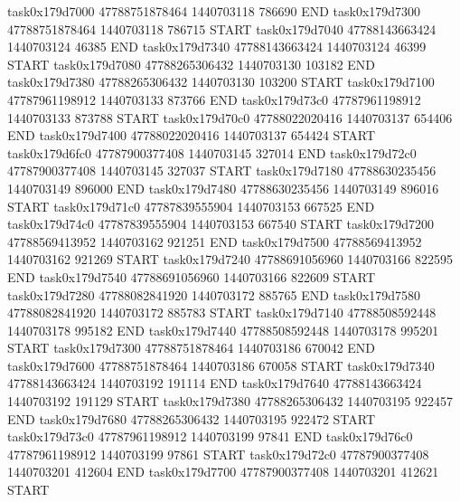task0x179d7000 47788751878464          1440703118               786690  END
task0x179d7300 47788751878464          1440703118               786715  START
task0x179d7040 47788143663424          1440703124                46385  END
task0x179d7340 47788143663424          1440703124                46399  START
task0x179d7080 47788265306432          1440703130               103182  END
task0x179d7380 47788265306432          1440703130               103200  START
task0x179d7100 47787961198912          1440703133               873766  END
task0x179d73c0 47787961198912          1440703133               873788  START
task0x179d70c0 47788022020416          1440703137               654406  END
task0x179d7400 47788022020416          1440703137               654424  START
task0x179d6fc0 47787900377408          1440703145               327014  END
task0x179d72c0 47787900377408          1440703145               327037  START
task0x179d7180 47788630235456          1440703149               896000  END
task0x179d7480 47788630235456          1440703149               896016  START
task0x179d71c0 47787839555904          1440703153               667525  END
task0x179d74c0 47787839555904          1440703153               667540  START
task0x179d7200 47788569413952          1440703162               921251  END
task0x179d7500 47788569413952          1440703162               921269  START
task0x179d7240 47788691056960          1440703166               822595  END
task0x179d7540 47788691056960          1440703166               822609  START
task0x179d7280 47788082841920          1440703172               885765  END
task0x179d7580 47788082841920          1440703172               885783  START
task0x179d7140 47788508592448          1440703178               995182  END
task0x179d7440 47788508592448          1440703178               995201  START
task0x179d7300 47788751878464          1440703186               670042  END
task0x179d7600 47788751878464          1440703186               670058  START
task0x179d7340 47788143663424          1440703192               191114  END
task0x179d7640 47788143663424          1440703192               191129  START
task0x179d7380 47788265306432          1440703195               922457  END
task0x179d7680 47788265306432          1440703195               922472  START
task0x179d73c0 47787961198912          1440703199                97841  END
task0x179d76c0 47787961198912          1440703199                97861  START
task0x179d72c0 47787900377408          1440703201               412604  END
task0x179d7700 47787900377408          1440703201               412621  START
